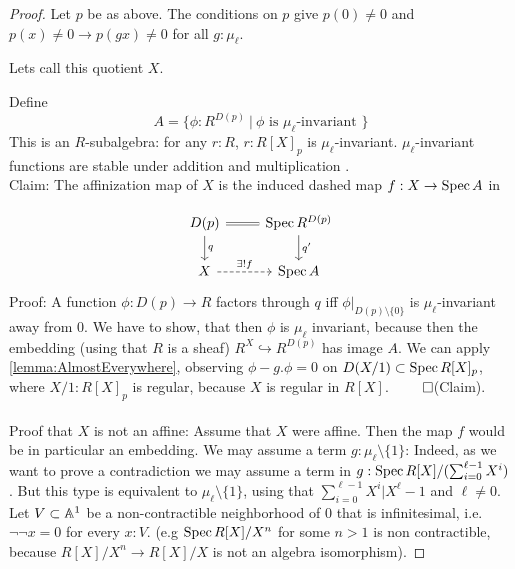\begin{proof}
	Let $p$ be as above.
	The conditions on $p$ give $p(0) \neq 0$ and $p(x) \neq 0 \to p(gx) \neq 0$ for all $g : \mu_\ell$.
	
	Lets call this quotient $X$.
	
	Define 
	\[
	A = \{\phi : R^{D(p)} \ | \ \phi \text{  is $\mu_{\ell}$-invariant }\}
	\]
	This is an $R$-subalgebra: for any $r : R$, $r : R[X]_p$ is $\mu_{\ell}$-invariant. $\mu_{\ell}$-invariant functions are stable under addition and multiplication . \\
	
	Claim: The affinization map of $X$ is the induced dashed map $f : X \to \operatorname{Spec} A$ in
	
	\[\begin{tikzcd}
		{D(p)} & {\Spec R^{D(p)}} \\
		X & {\Spec A}
		\arrow[Rightarrow, no head, from=1-1, to=1-2]
		\arrow["q", from=1-1, to=2-1]
		\arrow["q'",from=1-2, to=2-2]
		\arrow["{\exists! f}", dashed, from=2-1, to=2-2]
	\end{tikzcd}\]
	Proof: A function $\phi : D(p) \to R$ factors through $q$ iff $\phi|_{D(p) \setminus\{0\}}$ is $\mu_{\ell}$-invariant away from 0. We have to show, that then $\phi$ is $\mu_{\ell}$ invariant, because then the embedding (using that $R$ is a sheaf) $R^X \hookrightarrow R^{D(p)}$ has image $A$. We can apply  \ref{lemma:AlmostEverywhere}, observing $\phi - g.\phi = 0$ on $D(X / 1) \subset \operatorname{Spec} R[X]_p$, where $X/1 : R[X]_p$ is regular, because $X$ is regular in $R[X]$. $\qed$(Claim). 	\\ \\ %
	Proof that $X$ is not an affine:	Assume that $X$ were affine. Then the map $f$ would be in particular an embedding. 
	We may assume a term $g : \mu_\ell \setminus \{1\}$: Indeed, as we want to prove a contradiction we may assume a term in $g : \operatorname{Spec} R[X] / (\sum_{i=0}^{\ell-1} X^i)$. But this type is equivalent to $\mu_\ell \setminus \{1\}$, using that $\sum_{i=0}^{\ell-1} X^i | X^\ell -1 $ and $\ell \neq 0$. \\
	Let $V \subset \mathbb{A}^1$ be a non-contractible neighborhood of 0 that is infinitesimal, i.e.  $\lnot \lnot x =0$ for every $x : V$. (e.g $\operatorname{Spec} R[X] / X^n$ for some $n >1$ is non contractible, because $R[X] / X^n \to R[X] / X$ is not an algebra isomorphism). %

\end{proof}
